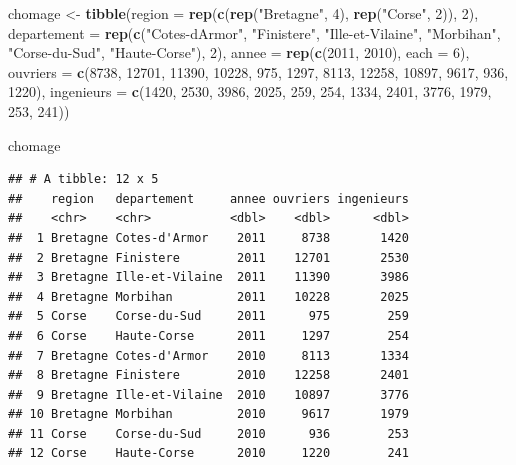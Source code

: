 \documentclass[
  11pt,
]{book}
\newenvironment{Shaded}{\begin{snugshade}}{\end{snugshade}}
\newcommand{\DataTypeTok}[1]{\textcolor[rgb]{0.13,0.29,0.53}{#1}}
\newcommand{\DecValTok}[1]{\textcolor[rgb]{0.00,0.00,0.81}{#1}}
\newcommand{\KeywordTok}[1]{\textcolor[rgb]{0.13,0.29,0.53}{\textbf{#1}}}
\newcommand{\NormalTok}[1]{#1}
\newcommand{\StringTok}[1]{\textcolor[rgb]{0.31,0.60,0.02}{#1}}
\numberwithin{equation}{section}
\numberwithin{countremarque}{section}
\begin{document}
\begin{Shaded}
\begin{Highlighting}[]
\NormalTok{chomage \textless{}{-}}\StringTok{ }
\StringTok{  }\KeywordTok{tibble}\NormalTok{(}\DataTypeTok{region =} \KeywordTok{rep}\NormalTok{(}\KeywordTok{c}\NormalTok{(}\KeywordTok{rep}\NormalTok{(}\StringTok{"Bretagne"}\NormalTok{, }\DecValTok{4}\NormalTok{), }\KeywordTok{rep}\NormalTok{(}\StringTok{"Corse"}\NormalTok{, }\DecValTok{2}\NormalTok{)), }\DecValTok{2}\NormalTok{),}
         \DataTypeTok{departement =} \KeywordTok{rep}\NormalTok{(}\KeywordTok{c}\NormalTok{(}\StringTok{"Cotes{-}d\textquotesingle{}Armor"}\NormalTok{, }\StringTok{"Finistere"}\NormalTok{,}
                             \StringTok{"Ille{-}et{-}Vilaine"}\NormalTok{, }\StringTok{"Morbihan"}\NormalTok{,}
                             \StringTok{"Corse{-}du{-}Sud"}\NormalTok{, }\StringTok{"Haute{-}Corse"}\NormalTok{), }\DecValTok{2}\NormalTok{),}
         \DataTypeTok{annee =} \KeywordTok{rep}\NormalTok{(}\KeywordTok{c}\NormalTok{(}\DecValTok{2011}\NormalTok{, }\DecValTok{2010}\NormalTok{), }\DataTypeTok{each =} \DecValTok{6}\NormalTok{),}
         \DataTypeTok{ouvriers =} \KeywordTok{c}\NormalTok{(}\DecValTok{8738}\NormalTok{, }\DecValTok{12701}\NormalTok{, }\DecValTok{11390}\NormalTok{, }\DecValTok{10228}\NormalTok{, }\DecValTok{975}\NormalTok{, }\DecValTok{1297}\NormalTok{,}
                      \DecValTok{8113}\NormalTok{, }\DecValTok{12258}\NormalTok{, }\DecValTok{10897}\NormalTok{, }\DecValTok{9617}\NormalTok{, }\DecValTok{936}\NormalTok{, }\DecValTok{1220}\NormalTok{),}
         \DataTypeTok{ingenieurs =} \KeywordTok{c}\NormalTok{(}\DecValTok{1420}\NormalTok{, }\DecValTok{2530}\NormalTok{, }\DecValTok{3986}\NormalTok{, }\DecValTok{2025}\NormalTok{, }\DecValTok{259}\NormalTok{, }\DecValTok{254}\NormalTok{,}
                        \DecValTok{1334}\NormalTok{, }\DecValTok{2401}\NormalTok{, }\DecValTok{3776}\NormalTok{, }\DecValTok{1979}\NormalTok{, }\DecValTok{253}\NormalTok{, }\DecValTok{241}\NormalTok{))}

\NormalTok{chomage}
\end{Highlighting}
\end{Shaded}

\begin{lstlisting}
## # A tibble: 12 x 5
##    region   departement     annee ouvriers ingenieurs
##    <chr>    <chr>           <dbl>    <dbl>      <dbl>
##  1 Bretagne Cotes-d'Armor    2011     8738       1420
##  2 Bretagne Finistere        2011    12701       2530
##  3 Bretagne Ille-et-Vilaine  2011    11390       3986
##  4 Bretagne Morbihan         2011    10228       2025
##  5 Corse    Corse-du-Sud     2011      975        259
##  6 Corse    Haute-Corse      2011     1297        254
##  7 Bretagne Cotes-d'Armor    2010     8113       1334
##  8 Bretagne Finistere        2010    12258       2401
##  9 Bretagne Ille-et-Vilaine  2010    10897       3776
## 10 Bretagne Morbihan         2010     9617       1979
## 11 Corse    Corse-du-Sud     2010      936        253
## 12 Corse    Haute-Corse      2010     1220        241
\end{lstlisting}
\end{document}
